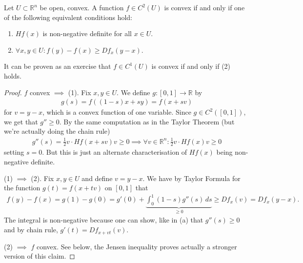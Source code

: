 \begin{prop}\label{prop:convex-hessian}
	Let $U \subset \mathbb{R}^{n}$ be open, convex. A function $f \in C^{2}(U)$ is convex if and only if one of the following equivalent conditions hold:
	\begin{enumerate}
		\item $Hf(x)$ is non-negative definite for all $x \in U$.
		\item $\forall x,y \in U: f(y) - f(x) \geq Df_{x}(y-x)$.
	\end{enumerate}
	It can be proven as an exercise that $f \in C^{1}(U)$ is convex if and only if (2) holds. 
\end{prop}
\begin{proof}
	$f$ convex $\implies$ (1). Fix $x,y \in U$. We define $g: [0,1] \to \mathbb{R}$ by
	\begin{align*}
		g(s) = f((1-s)x + sy) = f(x + sv)
	\end{align*}
	for $v = y-x$, which is a convex function of one variable. Since $g \in C^{2}([0,1])$, we get that $g'' \geq 0$. By the same computation as in the Taylor Theorem (but we're actually doing the chain rule)
	\begin{align*}
		g''(s) = \frac{1}{2} v \cdot Hf(x + sv) v \geq 0 \implies \forall v \in \mathbb{R}^{n}: \frac{1}{2}v \cdot Hf(x)v \geq 0
	\end{align*}
	setting $s=0$.
	But this is just an alternate characterisation of $Hf(x)$ being non-negative definite.

	(1) $\implies$ (2). Fix $x,y \in U$ and define $v = y-x$. We have by Taylor Formula for the function $g(t) = f(x+tv)$ on $[0,1]$ that
	\begin{align*}
		f(y) - f(x) = g(1) - g(0) = g'(0) + \underbrace{\int_{0}^{1} (1-s)g''(s) \, ds}_{\geq 0} \geq Df_{x}(v) = Df_{x}(y-x).
	\end{align*}
    The integral is non-negative because one can show, like in (a) that $g''(s) \geq 0$ and by chain rule, $g'(t) = Df_{x + vt}(v)$. 

	(2) $\implies$ $f$ convex. See below, the Jensen inequality proves actually a stronger version of this claim.
\end{proof}

